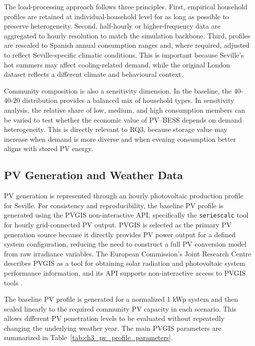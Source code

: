 The load-processing approach follows three principles. First, empirical household profiles are retained at individual-household level for as long as possible to preserve heterogeneity. Second, half-hourly or higher-frequency data are aggregated to hourly resolution to match the simulation backbone. Third, profiles are rescaled to Spanish annual consumption ranges and, where required, adjusted to reflect Seville-specific climatic conditions. This is important because Seville's hot summers may affect cooling-related demand, while the original London dataset reflects a different climate and behavioural context.

Community composition is also a sensitivity dimension. In the baseline, the 40-40-20 distribution provides a balanced mix of household types. In sensitivity analysis, the relative share of low, medium, and high consumption members can be varied to test whether the economic value of PV--BESS depends on demand heterogeneity. This is directly relevant to RQ3, because storage value may increase when demand is more diverse and when evening consumption better aligns with stored PV energy.

\subsection{PV Generation and Weather Data}
\label{sec:pv_generation_weather_data}

PV generation is represented through an hourly photovoltaic production profile for Seville. For consistency and reproducibility, the baseline PV profile is generated using the PVGIS non-interactive API, specifically the \texttt{seriescalc} tool for hourly grid-connected PV output. PVGIS is selected as the primary PV generation source because it directly provides PV power output for a defined system configuration, reducing the need to construct a full PV conversion model from raw irradiance variables. The European Commission's Joint Research Centre describes PVGIS as a tool for obtaining solar radiation and photovoltaic system performance information, and its API supports non-interactive access to PVGIS tools \cite{jrcndeuropean,jrcndeuropean2}.

The baseline PV profile is generated for a normalized 1 kWp system and then scaled linearly to the required community PV capacity in each scenario. This allows different PV penetration levels to be evaluated without repeatedly changing the underlying weather year. The main PVGIS parameters are summarized in Table~\ref{tab:ch3_pv_profile_parameters}.


